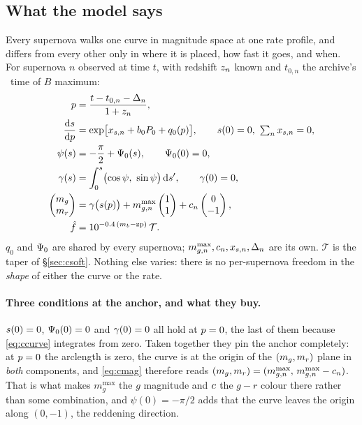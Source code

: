 \documentclass[11pt]{article}
\begin{document}
\subsection{What the model says}

Every supernova walks one curve in magnitude space at one rate profile, and differs from
every other only in where it is placed, how fast it goes, and when. For supernova $n$
observed at time $t$, with redshift $z_{n}$ known and $t_{0,n}$ the archive's \salt\
time of $B$ maximum:
\begin{align}
  \phase &= \frac{t - t_{0,n} - \Delta_{n}}{1 + \zred_{n}} ,
    \label{eq:cphase}\\
  \deriv{\arc}{\phase} &= \exp\bigl[x_{s,n} + b_{0}P_{0} + q_{0}(\phase)\bigr] ,
    \qquad \arc(0) = 0 ,\ \textstyle\sum_{n} x_{s,n} = 0 ,
    \label{eq:ctrav}\\
  \psi(\arc) &= -\frac{\pi}{2} + \turnzero(\arc) , \qquad \turnzero(0) = 0 ,
    \label{eq:cturn}\\
  \curve(\arc) &= \int_{0}^{\arc}\bigl(\cos\psi,\ \sin\psi\bigr)\,\dd\arc' ,
    \qquad \curve(0) = 0 ,
    \label{eq:ccurve}\\
  \begin{pmatrix} \magg \\ \magr \end{pmatrix} &=
    \curve\bigl(\arc(\phase)\bigr) + m_{g,n}^{\max}\begin{pmatrix} 1 \\ 1 \end{pmatrix}
    + \colr_{n}\begin{pmatrix} 0 \\ -1 \end{pmatrix} ,
    \label{eq:cmag}\\
  \hat f &= 10^{-0.4\,(m_{b} - \zp)}\,\mathcal{T} .
    \label{eq:cflux}
\end{align}
$q_{0}$ and $\Psi_{0}$ are shared by every supernova; $m_{g,n}^{\max}, c_{n}, x_{s,n},
\Delta_{n}$ are its own. $\mathcal{T}$ is the taper of \S\ref{sec:csoft}. Nothing else
varies: there is no per-supernova freedom in the \emph{shape} of either the curve or the
rate.

\paragraph{Three conditions at the anchor, and what they buy.} $s(0) = 0$,
$\Psi_{0}(0) = 0$ and $\gamma(0) = 0$ all hold at $p = 0$, the last of them because
\eqref{eq:ccurve} integrates from zero. Taken together they pin the anchor completely: at
$p = 0$ the arclength is zero, the curve is at the origin of the $(m_{g}, m_{r})$
plane in \emph{both} components, and \eqref{eq:cmag} therefore reads
$(m_{g}, m_{r}) = (m_{g,n}^{\max},\, m_{g,n}^{\max} - c_{n})$. That is what makes
$m_{g}^{\max}$ the $g$ magnitude and $c$ the $g-r$ colour there rather than some
combination, and $\psi(0) = -\pi/2$ adds that the curve leaves the origin along
$(0, -1)$, the reddening direction.
\end{document}
